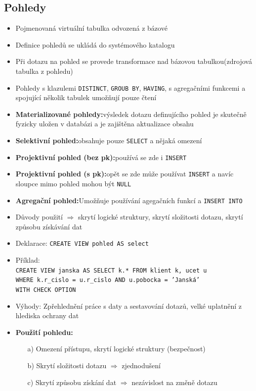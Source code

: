 \documentclass[a4paper,10pt]{article}
\newcommand{\pojem}[2]{\item \textbf{#1:}\quad #2}
\newcommand{\tedy}{$\Rightarrow$ }
\begin{document}
		\subsection{Pohledy}
			\begin{itemize}
				\item Pojmenovaná virtuální tabulka odvozená z bázové
				\item Definice pohledů se ukládá do systémového katalogu
				\item Při dotazu na pohled se provede transformace nad bázovou tabulkou(zdrojová tabulka z pohledu)
				\item Pohledy s klazulemi \texttt{DISTINCT}, \texttt{GROUB BY}, \texttt{HAVING}, s agregačními funkcemi a spojující několik tabulek umožňují pouze čtení

				\pojem{Materializované pohledy}{výsledek dotazu definujícího pohled je skutečně fyzicky uložen v databázi a je zajištěna aktualizace obsahu}
				\pojem{Selektivní pohled}{obsahuje pouze \texttt{SELECT} a nějaká omezení}
				\pojem{Projektivní pohled (bez pk)}{používá se zde i \texttt{INSERT}}
				\pojem{Projektivní pohled (s pk)}{opět se zde může používat \texttt{INSERT} a navíc sloupce mimo pohled mohou být \texttt{NULL}}
				\pojem{Agregační pohled}{Umožňuje  používání agegačních funkcí a \texttt{INSERT INTO}}
				
				\item Důvody použití \tedy skrytí logické struktury, skrytí složitosti dotazu, skrytí způsobu získávání dat
				\item Deklarace: \texttt{CREATE VIEW pohled AS select}
				\item Příklad: \\ \texttt{CREATE VIEW janska AS SELECT k.* FROM klient k, ucet u} \\
					\texttt{WHERE k.r\_cislo = u.r\_cislo AND u.pobocka = 'Janská'} \\
					\texttt{WITH CHECK OPTION} \\
				\item Výhody: Zpřehlednění práce s daty a sestavování dotazů, velké uplatnění z hlediska ochrany dat
				\pojem{Použití pohledu}
				\begin{itemize}
					\item[a)] Omezení přístupu, skrytí logické struktury (bezpečnost)
					\item[b)] Skrytí složitosti dotazu \tedy zjednodušení
					\item[c)] Skrytí způsobu získání dat \tedy nezávislost na změně dotazu
				\end{itemize}
			\end{itemize}
\end{document}
